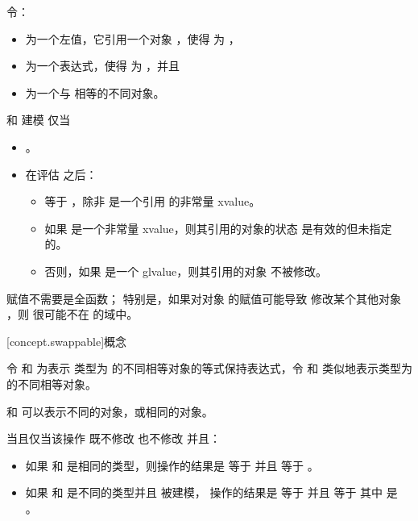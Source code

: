 \begin{itemdescr}
\pnum
令：
\begin{itemize}
\item {} 为一个左值，它引用一个对象 ，使得
   为 ，
\item {} 为一个表达式，使得  为
  ，并且
\item {} 为一个与  相等的不同对象。
\end{itemize}
 和  建模
 仅当

\begin{itemize}
\item {}。

\item 在评估  之后：

\begin{itemize}
\item {} 等于 ，除非  是一个引用  的非常量
xvalue。

\item 如果  是一个非常量 xvalue，则其引用的对象的状态
是有效的但未指定的。

\item 否则，如果  是一个 glvalue，则其引用的对象
  不被修改。
\end{itemize}
\end{itemize}

\pnum
\begin{note}
赋值不需要是全函数；
特别是，如果对对象  的赋值可能导致
修改某个其他对象 ，则  很可能不在 \tcode{=} 的域中。
\end{note}
\end{itemdescr}

[concept.swappable]{概念 }

\pnum
令  和  为表示
类型为  的不同相等对象的等式保持表达式，令  和 
类似地表示类型为  的不同相等对象。
\begin{note}
 和  可以表示不同的对象，或相同的对象。
\end{note}
当且仅当该操作
既不修改  也不修改  并且：
\begin{itemize}
\item 如果  和  是相同的类型，则操作的结果是
   等于  并且  等于 。

\item 如果  和  是不同的类型并且
  被建模，
  操作的结果是
   等于 
  并且
   等于 
  其中  是 。
\end{itemize}

